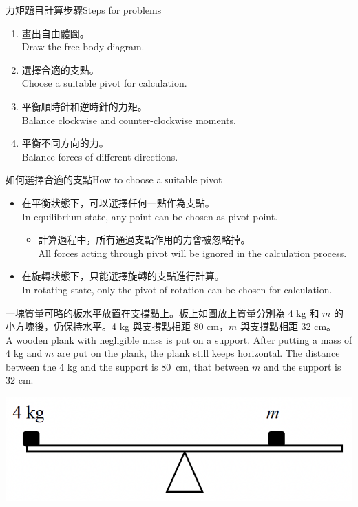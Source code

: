 \documentclass[beamer=true]{standalone}
\begin{document}
\begin{frame}{力矩題目計算步驟Steps for problems}
    \begin{enumerate}
        \item 畫出自由體圖。\\Draw the free body diagram.
        \item 選擇合適的支點。\\Choose a suitable pivot for calculation.
        \item 平衡順時針和逆時針的力矩。\\Balance clockwise and counter-clockwise moments.
        \item 平衡不同方向的力。\\Balance forces of different directions.
    \end{enumerate}
\end{frame}
\begin{frame}{如何選擇合適的支點How to choose a suitable pivot}
    \begin{itemize}
        \item 在平衡狀態下，可以選擇任何一點作為支點。\\In equilibrium state, any point can be chosen as pivot point.
              \begin{itemize}
                  \item 計算過程中，所有通過支點作用的力會被忽略掉。\\All forces acting through pivot will be ignored in the calculation process.
              \end{itemize}
        \item 在旋轉狀態下，只能選擇旋轉的支點進行計算。\\In rotating state, only the pivot of rotation can be chosen for calculation.
    \end{itemize}
\end{frame}



\begin{eg}
    一塊質量可略的板水平放置在支撐點上。板上如圖放上質量分別為 4 kg 和 $m$ 的小方塊後，仍保持水平。4 kg 與支撐點相距 80 cm，$m$ 與支撐點相距 32 cm。\\A wooden plank with negligible mass is put on a support. After putting a mass of 4 kg and $m$ are put on the plank, the plank still keeps horizontal. The distance between the 4 kg and the support is \qty{80}{cm}, that between $m$ and the support is 32 cm.
        {\par\centering
            \includegraphics[width=.4\textwidth]{assets/b025a484.png}
            \par}

\end{eg}
\end{document}
